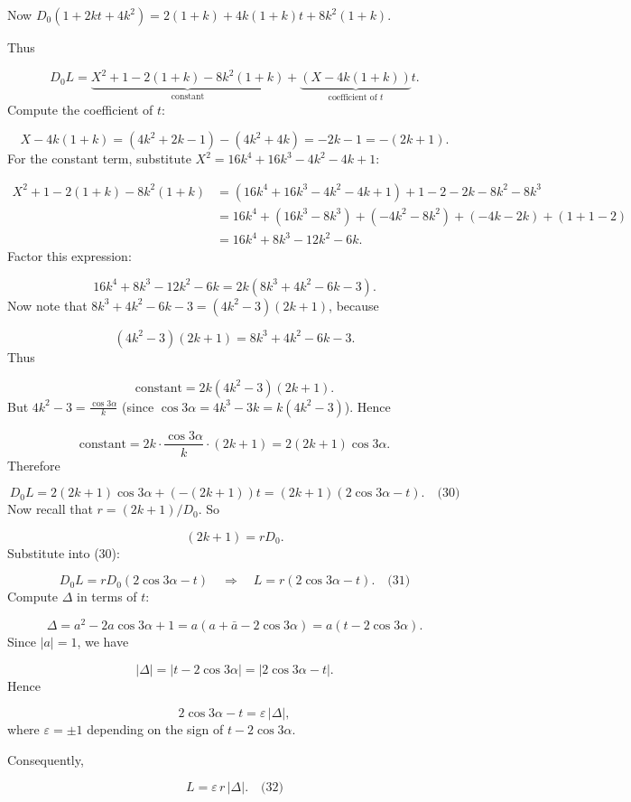 Now \(D_0(1 + 2k t + 4k^2) = 2(1+k) + 4k(1+k) t + 8k^2(1+k).\)\par
Thus\par
\[
D_0 L = \underbrace{X^2 + 1 - 2(1+k) - 8k^2(1+k)}_{\text{constant}} + \underbrace{(X - 4k(1+k))}_{\text{coefficient of }t} t.
\]
Compute the coefficient of \(t\):\par
\[
X - 4k(1+k) = (4k^2+2k-1) - (4k^2+4k) = -2k-1 = -(2k+1).
\]
For the constant term, substitute \(X^2 = 16k^4+16k^3-4k^2-4k+1\):\par
\[
\begin{aligned}
X^2 + 1 - 2(1+k) - 8k^2(1+k)
&= (16k^4+16k^3-4k^2-4k+1) + 1 - 2 - 2k - 8k^2 - 8k^3 \\
&= 16k^4 + (16k^3-8k^3) + (-4k^2-8k^2) + (-4k-2k) + (1+1-2) \\
&= 16k^4 + 8k^3 - 12k^2 - 6k.
\end{aligned}
\]
Factor this expression:\par
\[
16k^4 + 8k^3 - 12k^2 - 6k = 2k(8k^3+4k^2-6k-3).
\]
Now note that \(8k^3+4k^2-6k-3 = (4k^2-3)(2k+1)\), because\par
\[
(4k^2-3)(2k+1) = 8k^3+4k^2-6k-3.
\]
Thus\par
\[
\text{constant} = 2k (4k^2-3)(2k+1).
\]
But \(4k^2-3 = \frac{\cos3\alpha}{k}\) (since \(\cos3\alpha = 4k^3-3k = k(4k^2-3)\)). Hence\par
\[
\text{constant} = 2k \cdot \frac{\cos3\alpha}{k} \cdot (2k+1) = 2(2k+1)\cos3\alpha.
\]
Therefore\par
\[
D_0 L = 2(2k+1)\cos3\alpha + (-(2k+1)) t = (2k+1)(2\cos3\alpha - t). \quad\text{(30)}
\]
Now recall that \(r = (2k+1)/D_0\). So\par
\[
(2k+1) = r D_0.
\]
Substitute into (30):\par
\[
D_0 L = r D_0 (2\cos3\alpha - t) \quad\Longrightarrow\quad L = r (2\cos3\alpha - t). \quad\text{(31)}
\]
Compute \(\Delta\) in terms of \(t\):\par
\[
\Delta = a^2 - 2a\cos3\alpha + 1 = a(a + \bar a - 2\cos3\alpha) = a(t - 2\cos3\alpha).
\]
Since \(|a|=1\), we have\par
\[
|\Delta| = |t - 2\cos3\alpha| = |2\cos3\alpha - t|.
\]
Hence\par
\[
2\cos3\alpha - t = \varepsilon\, |\Delta|,
\]
where \(\varepsilon = \pm 1\) depending on the sign of \(t - 2\cos3\alpha\).\par
Consequently,\par
\[
L = \varepsilon\, r\, |\Delta|. \quad\text{(32)}
\]
